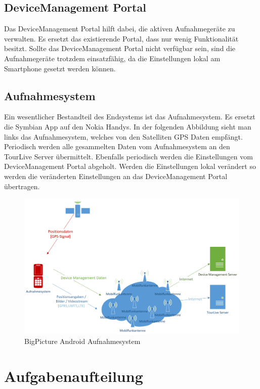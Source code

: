 \subsection{DeviceManagement Portal}
Das DeviceManagement Portal hilft dabei, die aktiven Aufnahmegeräte zu verwalten. Es ersetzt das existierende Portal, dass nur wenig Funktionalität besitzt. Sollte das DeviceManagement Portal nicht verfügbar sein, sind die Aufnahmegeräte trotzdem einsatzfähig, da die Einstellungen lokal am Smartphone gesetzt werden können.

\subsection{Aufnahmesystem}
Ein wesentlicher Bestandteil des Endsystems ist das Aufnahmesystem. Es ersetzt die Symbian App auf den Nokia Handys. In der folgenden Abbildung sieht man links das Aufnahmesystem, welches von den Satelliten GPS Daten empfängt. Periodisch werden alle gesammelten Daten vom Aufnahmesystem an den TourLive Server übermittelt. Ebenfalls periodisch werden die Einstellungen vom DeviceManagement Portal abgeholt. Werden die Einstellungen lokal verändert so werden die veränderten Einstellungen an das DeviceManagement Portal übertragen.
\begin{figure}[H]
	\centering
	\includegraphics[width=150mm]{images/android/BigPicture_AndroidClient.png} 
	\caption{BigPicture Android Aufnahmesystem}
\end{figure}

\section{Aufgabenaufteilung}

